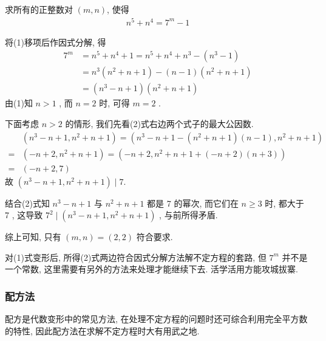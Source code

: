 \begin{example}
	求所有的正整数对 $(m, n)$, 使得
	\begin{align*}
		n^{5}+n^{4}=7^{m}-1
	\end{align*}
\end{example}
\begin{solution}
	将(1)移项后作因式分解, 得\begin{align}
		7^{m} & =n^{5}+n^{4}+1=n^{5}+n^{4}+n^{3}-\left(n^{3}-1\right)    \\
		      & =n^{3}\left(n^{2}+n+1\right)-(n-1)\left(n^{2}+n+1\right) \\
		      & =\left(n^{3}-n+1\right)\left(n^{2}+n+1\right)
	\end{align}
	由(1)知 $n>1$ , 而 $n=2$ 时, 可得 $m=2$ .

	下面考虑 $n>2$ 的情形, 我们先看(2)式右边两个式子的最大公因数.
	\begin{align}
		  & \left(n^{3}-n+1, n^{2}+n+1\right)=\left(n^{3}-n+1-\left(n^{2}+n+1\right)(n-1), n^{2}+n+1\right) \\
		= & \left(-n+2, n^{2}+n+1\right)=\left(-n+2, n^{2}+n+1+(-n+2)(n+3)\right)                           \\
		= & (-n+2,7)
	\end{align}
	故 $\left(n^{3}-n+1, n^{2}+n+1\right) \mid 7$.

	结合(2)式知 $n^{3}-n+1$ 与 $n^{2}+n+1$ 都是 7 的幂次, 而它们在 $n \geqslant 3$ 时, 都大于 7 , 这导致 $7^{2} \mid\left(n^{3}-n+1, n^{2}+n+1\right)$ , 与前所得矛盾.

	综上可知, 只有 $(m, n)=(2,2)$ 符合要求.
\end{solution}
\begin{note}
	对(1)式变形后, 所得(2)式两边符合因式分解方法解不定方程的套路, 但 $7^{m}$ 并不是一个常数, 这里需要有另外的方法来处理才能继续下去. 活学活用方能攻城拔寨.
\end{note}

\subsubsection{配方法}
配方是代数变形中的常见方法, 在处理不定方程的问题时还可综合利用完全平方数的特性, 因此配方法在求解不定方程时大有用武之地.

